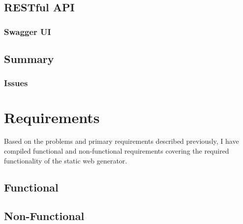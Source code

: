 \subsection{RESTful API}

\subsubsection{Swagger UI}

\subsection{Summary}

\subsubsection{Issues}


\section{Requirements}
Based on the problems and primary requirements described previously, I have compiled functional and non-functional requirements covering the required functionality of the static web generator.

\subsection{Functional}


\subsection{Non-Functional}



